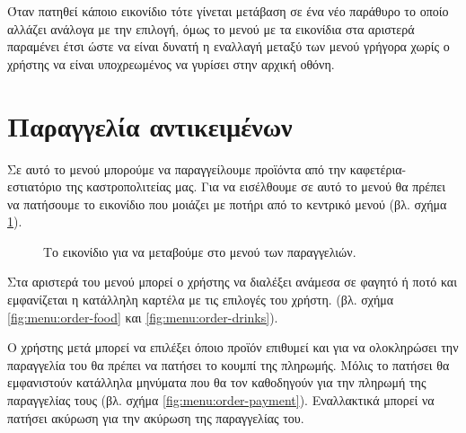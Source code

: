 \documentclass[a4paper,titlepage,twoside,12pt,leqno]{article}
\begin{document}

Όταν πατηθεί κάποιο εικονίδιο τότε γίνεται μετάβαση σε ένα νέο παράθυρο το οποίο αλλάζει ανάλογα με την επιλογή, όμως το μενού με τα εικονίδια στα αριστερά παραμένει έτσι ώστε να είναι δυνατή η εναλλαγή μεταξύ των μενού γρήγορα χωρίς ο χρήστης να είναι υποχρεωμένος να γυρίσει στην αρχική οθόνη.

\section{Παραγγελία αντικειμένων}
\label{paraggelia}

Σε αυτό το μενού μπορούμε να παραγγείλουμε προϊόντα από την καφετέρια-εστιατόριο της καστροπολιτείας μας. Για να εισέλθουμε σε αυτό το μενού θα πρέπει να πατήσουμε το εικονίδιο που μοιάζει με ποτήρι από το κεντρικό μενού (βλ. σχήμα \ref{fig:icon:order}).

\begin{figure}
\begin{center}
\caption{Το εικονίδιο για να μεταβούμε στο μενού των παραγγελιών.}
\label{fig:icon:order}
\end{center}
\end{figure}

Στα αριστερά του μενού μπορεί ο χρήστης να διαλέξει ανάμεσα σε φαγητό ή ποτό και εμφανίζεται η κατάλληλη καρτέλα με τις επιλογές του χρήστη. (βλ. σχήμα \ref{fig:menu:order-food} και \ref{fig:menu:order-drinks}).

Ο χρήστης μετά μπορεί να επιλέξει όποιο προϊόν επιθυμεί και για να ολοκληρώσει την παραγγελία του θα πρέπει να πατήσει το κουμπί της πληρωμής. Μόλις το πατήσει θα εμφανιστούν κατάλληλα μηνύματα που θα τον καθοδηγούν για την πληρωμή της παραγγελίας τους (βλ. σχήμα \ref{fig:menu:order-payment}). Εναλλακτικά μπορεί να πατήσει ακύρωση για την ακύρωση της παραγγελίας του.
\end{document}

